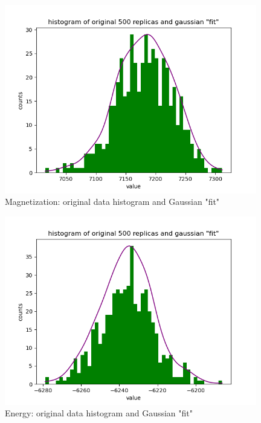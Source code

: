 \documentclass[11pt, letterpaper, onecolumn]{article}
\begin{document}
\begin{figure} [h] 
	\begin{center}
	\includegraphics[width=11cm]{"orig_magn.png"}
\caption{Magnetization: original data histogram and Gaussian "fit"}	\label{fig:app2}
	\end{center}
	\end{figure}

	\begin{figure} [h] 
	\begin{center}
	\includegraphics[width=11cm]{"orig_energy.png"}
\caption{Energy: original data histogram and Gaussian "fit"}	\label{fig:app3}
	\end{center}
	\end{figure}

	
\end{document}
